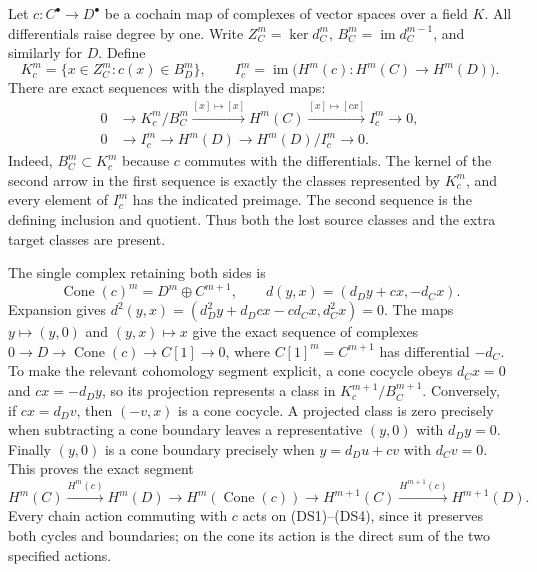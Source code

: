 Let $c:C^\bullet\to D^\bullet$ be a cochain map of complexes of vector
spaces over a field $K$.  All differentials raise degree by one.  Write
$Z_C^m=\ker d_C^m$, $B_C^m=\operatorname{im}d_C^{m-1}$, and similarly
for $D$.  Define
\[
 K_c^m=\{x\in Z_C^m:c(x)\in B_D^m\},\qquad
 I_c^m=\operatorname{im}\bigl(H^m(c):H^m(C)\to H^m(D)\bigr).
 \tag{DS1}
\]
There are exact sequences with the displayed maps:
\[
\begin{split}
0&\longrightarrow K_c^m/B_C^m
 \xrightarrow{[x]\mapsto[x]} H^m(C)
 \xrightarrow{[x]\mapsto[cx]} I_c^m\longrightarrow0,\\
0&\longrightarrow I_c^m\longrightarrow H^m(D)
 \longrightarrow H^m(D)/I_c^m\longrightarrow0.
\end{split}\tag{DS2}
\]
Indeed, $B_C^m\subset K_c^m$ because $c$ commutes with the differentials.
The kernel of the second arrow in the first sequence is exactly the
classes represented by $K_c^m$, and every element of $I_c^m$ has the
indicated preimage.  The second sequence is the defining inclusion and
quotient.  Thus both the lost source classes and the extra target classes
are present.

The single complex retaining both sides is
\[
 \operatorname{Cone}(c)^m=D^m\oplus C^{m+1},\qquad
 d(y,x)=(d_Dy+cx,-d_Cx).
 \tag{DS3}
\]
Expansion gives $d^2(y,x)=(d_D^2y+d_Dcx-cd_Cx,d_C^2x)=0$.
The maps $y\mapsto(y,0)$ and $(y,x)\mapsto x$ give the exact sequence
of complexes $0\to D\to\operatorname{Cone}(c)\to C[1]\to0$, where
$C[1]^m=C^{m+1}$ has differential $-d_C$.  To make the relevant
cohomology segment explicit, a cone cocycle obeys
$d_Cx=0$ and $cx=-d_Dy$, so its projection represents a class in
$K_c^{m+1}/B_C^{m+1}$.  Conversely, if $cx=d_Dv$, then $(-v,x)$
is a cone cocycle.  A projected class is zero precisely when subtracting
a cone boundary leaves a representative $(y,0)$ with $d_Dy=0$.
Finally $(y,0)$ is a cone boundary precisely when
$y=d_Du+cv$ with $d_Cv=0$.  This proves the exact segment
\[
 H^m(C)\xrightarrow{H^m(c)} H^m(D)
 \longrightarrow H^m(\operatorname{Cone}(c))
 \longrightarrow H^{m+1}(C)\xrightarrow{H^{m+1}(c)}H^{m+1}(D).
 \tag{DS4}
\]
Every chain action commuting with $c$ acts on (DS1)--(DS4), since it
preserves both cycles and boundaries; on the cone its action is the
direct sum of the two specified actions.


